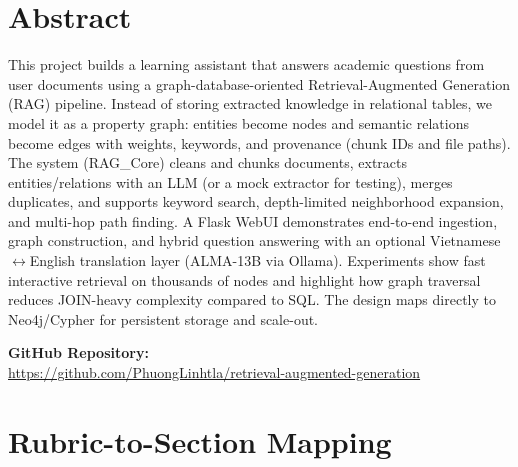 \section*{Abstract}

This project builds a learning assistant that answers academic questions from user documents using a graph-database-oriented Retrieval-Augmented Generation (RAG) pipeline. Instead of storing extracted knowledge in relational tables, we model it as a property graph: entities become nodes and semantic relations become edges with weights, keywords, and provenance (chunk IDs and file paths). The system (RAG\_Core) cleans and chunks documents, extracts entities/relations with an LLM (or a mock extractor for testing), merges duplicates, and supports keyword search, depth-limited neighborhood expansion, and multi-hop path finding. A Flask WebUI demonstrates end-to-end ingestion, graph construction, and hybrid question answering with an optional Vietnamese$\leftrightarrow$English translation layer (ALMA-13B via Ollama). Experiments show fast interactive retrieval on thousands of nodes and highlight how graph traversal reduces JOIN-heavy complexity compared to SQL. The design maps directly to Neo4j/Cypher for persistent storage and scale-out.

\noindent\textbf{GitHub Repository:}\\
\url{https://github.com/PhuongLinhtla/retrieval-augmented-generation}

\section*{Rubric-to-Section Mapping}

